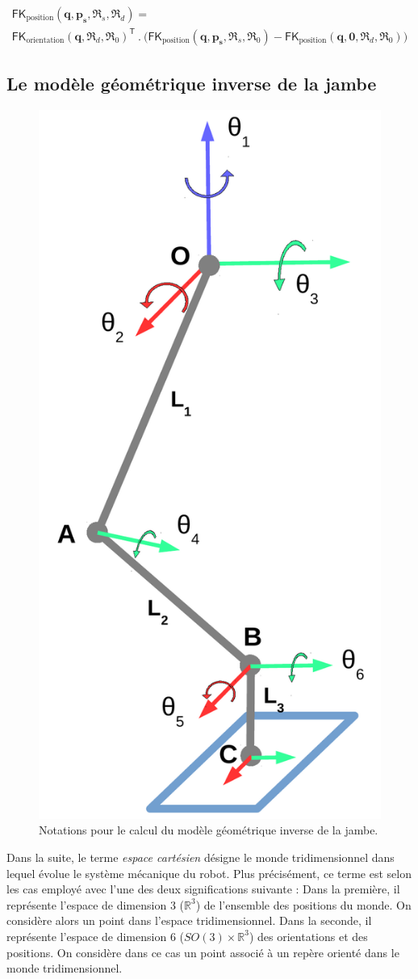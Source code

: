 \begin{gather*}
\mathsf{FK}_{\text{position}}(\bm{q}, \bm{p_s}, \mathfrak{R}_s, \mathfrak{R}_d) = \\
\mathsf{FK}_{\text{orientation}}(\bm{q}, \mathfrak{R}_{d}, \mathfrak{R}_{0})^{\mathsf{T}}~.~
\big(
\mathsf{FK}_{\text{position}}(\bm{q}, \bm{p_s}, \mathfrak{R}_s, \mathfrak{R}_0) -
\mathsf{FK}_{\text{position}}(\bm{q}, \bm{0}, \mathfrak{R}_d, \mathfrak{R}_0)
\big)
\end{gather*}

\subsection{Le modèle géométrique inverse de la jambe\label{sec:modele_inverse}}

\begin{figure}[htb]
    \begin{center}
        \includegraphics[type=pdf,ext=.pdf,read=.pdf,width=0.25\linewidth]{../schema/leg_ik}
        \caption{\label{fig:leg_ik}Notations pour le calcul du modèle géométrique inverse de la jambe.}
    \end{center}
\end{figure}

\begin{definition}
    Dans la suite, le terme \og \textit{espace cartésien} \fg désigne le monde 
    tridimensionnel dans lequel évolue le système mécanique du robot.
    Plus précisément, ce terme est selon les cas employé avec l'une 
    des deux significations suivante :
    Dans la première, il représente l'espace de dimension $3$ ($\mathbb{R}^3$)
    de l'ensemble des positions du monde. On considère alors
    un point dans l'espace tridimensionnel.
    Dans la seconde, il représente l'espace de dimension $6$ ($SO(3) \times \mathbb{R}^3$)
    des orientations et des positions. On considère dans ce cas un point associé à un
    repère orienté dans le monde tridimensionnel.
\end{definition}

